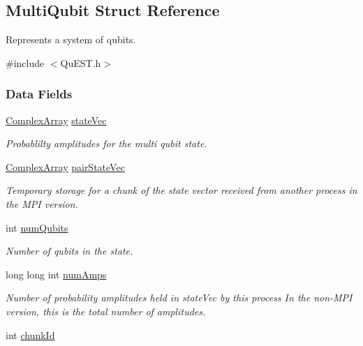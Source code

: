 \hypertarget{structMultiQubit}{
\subsection{MultiQubit Struct Reference}
\label{structMultiQubit}
}


Represents a system of qubits.  


{\ttfamily \#include $<$QuEST.h$>$}\subsubsection*{Data Fields}
\begin{DoxyCompactItemize}
\item 
\hyperlink{structComplexArray}{ComplexArray} \hyperlink{structMultiQubit_a45483190d6b01ef6b2f98f2bec9ab94f}{stateVec}
\begin{DoxyCompactList}\small\item\em Probablilty amplitudes for the multi qubit state. \item\end{DoxyCompactList}\item 
\hyperlink{structComplexArray}{ComplexArray} \hyperlink{structMultiQubit_a76f7db4eab52d2b30f58f973ada809c5}{pairStateVec}
\begin{DoxyCompactList}\small\item\em Temporary storage for a chunk of the state vector received from another process in the MPI version. \item\end{DoxyCompactList}\item 
int \hyperlink{structMultiQubit_ab5b9795bdc6fb5855e1974dcbbaeb36f}{numQubits}
\begin{DoxyCompactList}\small\item\em Number of qubits in the state. \item\end{DoxyCompactList}\item 
long long int \hyperlink{structMultiQubit_ae16f47d8b725c914fb7f66b6498d79db}{numAmps}
\begin{DoxyCompactList}\small\item\em Number of probability amplitudes held in stateVec by this process In the non-\/MPI version, this is the total number of amplitudes. \item\end{DoxyCompactList}\item 
int \hyperlink{structMultiQubit_ab10c88249fa3825d6227ceec01d37e37}{chunkId}

\end{DoxyCompactItemize}
